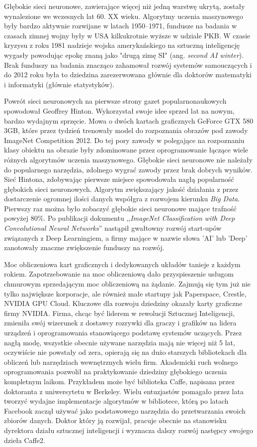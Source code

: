 \documentclass[12pt,a4paper,twoside,titlepage,openright]{book}
\begin{document}
Głębokie sieci neuronowe, zawierające więcej niż jedną warstwę ukrytą, zostały wynalezione we wczesnych lat 60. XX wieku. Algorytmy uczenia maszynowego były bardzo aktywnie rozwijane w latach 1950--1971, fundusze na badania w czasach zimnej wojny były w USA kilkukrotnie wyższe w udziale PKB. W czasie kryzysu z roku 1981 nadzieje wojska amerykańskiego na sztuczną inteligencję wygasły powodując epokę znaną jako "drugą zimę SI" (ang. \textit{second AI winter}). Brak funduszy na badania znacząco zahamował rozwój systemów samouczących i do 2012 roku była to dziedzina zarezerwowana głównie dla doktorów matematyki i informatyki (głównie statystyków). \cite{siteAIhistory}

Powrót sieci neuronowych na pierwsze strony gazet popularnonaukowych spowodował Geoffrey Hinton. Wykorzystał swoje idee sprzed lat na nowym, bardzo wydajnym sprzęcie. Mowa o dwóch kartach graficznych GeForce GTX 580 3GB\cite{NIPS2012_4824}, które przez tydzień trenowały model do rozpoznania obrazów pod zawody ImageNet Competition 2012. Do tej pory zawody w polegające na rozpoznaniu klasy obiektu na obrazie były zdominowane przez oprogramowanie łączące wiele różnych algorytmów uczenia maszynowego. Głębokie sieci neuronowe nie należały do popularnego narzędzia, zdolnego wygrać zawody przez brak dobrych wyników. Sieć Hintona, zdobywając pierwsze miejsce spowodowała nagłą popularność głębokich sieci neuronowych. Algorytm zwiększający jakość działania z przez dostarczenie ogromnej ilości danych współgra z rozwojem kierunku \textit{Big Data}. Pierwszy raz można było zobaczyć głębokie sieci neuronowe mające trafność powyżej 80\%. Po publikacji dokumentu ,,\textit{ImageNet Classification with Deep Convolutional Neural Networks}'' nastąpił gwałtowny rozwój start-upów związanych z Deep Learningiem, a firmy mające w nazwie słowa 'AI' lub 'Deep' zanotowały znaczne zwiększenie funduszy na rozwój.

Moc obliczeniowa kart graficznych i dedykowanych układów tanieje z każdym rokiem. Zapotrzebowanie na moc obliczeniową dało przyspieszenie usługom chmurowym sprzedającym moc obliczeniową na żądanie. Zajmują się tym już nie tylko największe korporacje, ale również małe startupy jak Paperspace, Crestle, NVIDIA GPU Cloud. Kluczowe dla rozwoju dziedziny okazały karty graficzne firmy NVIDIA. Firma, chcąc być liderem w rewolucji Sztucznej Inteligencji, zmieniła swój wizerunek z dostawcy rozrywki dla graczy i grafików na lidera urządzeń i oprogramowania stanowiącego podstawę systemów uczących. Przez nagłą modę, wszystkie obecnie używane narzędzia mają nie więcej niż 5 lat, oczywiście nie powstały od zera, opierają się na dużo starszych bibliotekach dla obliczeń lub narzędziach wewnętrznych wielu firm. Akademicki ruch wolnego oprogramowania pozwolił na praktykowanie dziedziny głębokiego uczenia kompletnym laikom. Przykładem może być biblioteka Caffe, napisana przez doktoranta z uniwersytetu w Berkeley. Wielu entuzjastów pomagało przez lata tworzyć wydajne implementacje algorytmów w bibliotece, którą po latach Facebook zaczął używać jako podstawowego narzędzia do przetwarzania swoich zbiorów danych. Doktor który ją rozwijał, pracuje obecnie na stanowisku dyrektora działu sztucznej inteligencji i wyznacza dalszy rozwój następcy swojego dzieła Caffe2. \cite{siteJia}
\end{document}
